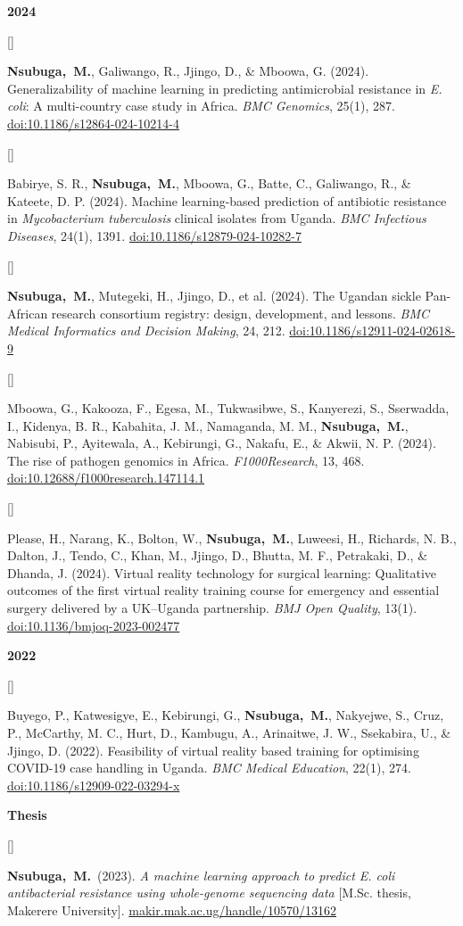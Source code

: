 \documentclass[10pt]{article}
\newlength{\pubcol}\setlength{\pubcol}{0.9cm}     %
\newlength{\subheadgap}\setlength{\subheadgap}{4pt}   %
\newlength{\entrygap}\setlength{\entrygap}{10pt}       %
\newcommand{\subhead}[1]{\par\addvspace{\entrygap}%
  {\headfont\small\bfseries\color{muted}#1}\par\nopagebreak\addvspace{\subheadgap}}
\newcounter{pubno}
\newcommand{\me}{\textbf{Nsubuga,~M.}}
\newcommand{\pub}[1]{\stepcounter{pubno}%
  \par\addvspace{\entrygap}%
  \noindent\parbox[t]{\pubcol}{\raggedright\leavevmode\headfont\small\color{muted}[\thepubno]}%
  \parbox[t]{\dimexpr\linewidth-\pubcol\relax}{\raggedright #1}\par\addvspace{\entrygap}}
\newcommand{\doi}[1]{\href{https://doi.org/#1}{doi:#1}}
\begin{document}
\subhead{2024}
\pub{\me, Galiwango, R., Jjingo, D., \& Mboowa, G. (2024). Generalizability of machine learning in predicting antimicrobial resistance in \textit{E. coli}: A multi-country case study in Africa. \textit{BMC Genomics}, 25(1), 287. \doi{10.1186/s12864-024-10214-4}}
\pub{Babirye, S. R., \me, Mboowa, G., Batte, C., Galiwango, R., \& Kateete, D. P. (2024). Machine learning-based prediction of antibiotic resistance in \textit{Mycobacterium tuberculosis} clinical isolates from Uganda. \textit{BMC Infectious Diseases}, 24(1), 1391. \doi{10.1186/s12879-024-10282-7}}
\pub{\me, Mutegeki, H., Jjingo, D., et al. (2024). The Ugandan sickle Pan-African research consortium registry: design, development, and lessons. \textit{BMC Medical Informatics and Decision Making}, 24, 212. \doi{10.1186/s12911-024-02618-9}}
\pub{Mboowa, G., Kakooza, F., Egesa, M., Tukwasibwe, S., Kanyerezi, S., Sserwadda, I., Kidenya, B. R., Kabahita, J. M., Namaganda, M. M., \me, Nabisubi, P., Ayitewala, A., Kebirungi, G., Nakafu, E., \& Akwii, N. P. (2024). The rise of pathogen genomics in Africa. \textit{F1000Research}, 13, 468. \doi{10.12688/f1000research.147114.1}}
\pub{Please, H., Narang, K., Bolton, W., \me, Luweesi, H., Richards, N. B., Dalton, J., Tendo, C., Khan, M., Jjingo, D., Bhutta, M. F., Petrakaki, D., \& Dhanda, J. (2024). Virtual reality technology for surgical learning: Qualitative outcomes of the first virtual reality training course for emergency and essential surgery delivered by a UK--Uganda partnership. \textit{BMJ Open Quality}, 13(1). \doi{10.1136/bmjoq-2023-002477}}

\subhead{2022}
\pub{Buyego, P., Katwesigye, E., Kebirungi, G., \me, Nakyejwe, S., Cruz, P., McCarthy, M. C., Hurt, D., Kambugu, A., Arinaitwe, J. W., Ssekabira, U., \& Jjingo, D. (2022). Feasibility of virtual reality based training for optimising COVID-19 case handling in Uganda. \textit{BMC Medical Education}, 22(1), 274. \doi{10.1186/s12909-022-03294-x}}

\subhead{Thesis}
\pub{\me\ (2023). \textit{A machine learning approach to predict E. coli antibacterial resistance using whole-genome sequencing data} [M.Sc. thesis, Makerere University]. \href{http://makir.mak.ac.ug/handle/10570/13162}{makir.mak.ac.ug/handle/10570/13162}}

\end{document}
